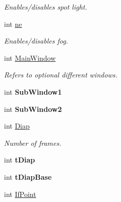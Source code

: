 \begin{DoxyCompactItemize}
\begin{DoxyCompactList}\small\item\em \-Enables/disables spot light. \end{DoxyCompactList}\item 
\hypertarget{classDraw_a3bf1137663f19e5c361c845cf4dfb7db}{int \hyperlink{classDraw_a3bf1137663f19e5c361c845cf4dfb7db}{ne}}\label{classDraw_a3bf1137663f19e5c361c845cf4dfb7db}

\begin{DoxyCompactList}\small\item\em \-Enables/disables fog. \end{DoxyCompactList}\item 
\hypertarget{classDraw_a5123239dd409d2f813d6f4a39a93a560}{int \hyperlink{classDraw_a5123239dd409d2f813d6f4a39a93a560}{\-Main\-Window}}\label{classDraw_a5123239dd409d2f813d6f4a39a93a560}

\begin{DoxyCompactList}\small\item\em \-Refers to optional different windows. \end{DoxyCompactList}\item 
\hypertarget{classDraw_a74c5901821f0f6af7ab263d68531cec7}{int {\bfseries \-Sub\-Window1}}\label{classDraw_a74c5901821f0f6af7ab263d68531cec7}

\item 
\hypertarget{classDraw_a173b380ef4c4936a84d502de1aba75fe}{int {\bfseries \-Sub\-Window2}}\label{classDraw_a173b380ef4c4936a84d502de1aba75fe}

\item 
\hypertarget{classDraw_a5552c93f6dc60d50f083dba82fc5b6cd}{int \hyperlink{classDraw_a5552c93f6dc60d50f083dba82fc5b6cd}{\-Diap}}\label{classDraw_a5552c93f6dc60d50f083dba82fc5b6cd}

\begin{DoxyCompactList}\small\item\em \-Number of frames. \end{DoxyCompactList}\item 
\hypertarget{classDraw_acbff79358479b6a19d039b6ec5ddaf0d}{int {\bfseries t\-Diap}}\label{classDraw_acbff79358479b6a19d039b6ec5ddaf0d}

\item 
\hypertarget{classDraw_a59c57b93252d1e0fca068a43c3a231e3}{int {\bfseries t\-Diap\-Base}}\label{classDraw_a59c57b93252d1e0fca068a43c3a231e3}

\item 
\hypertarget{classDraw_a4bd038ddc170e76bc94d37feb742667c}{int \hyperlink{classDraw_a4bd038ddc170e76bc94d37feb742667c}{\-If\-Point}}\label{classDraw_a4bd038ddc170e76bc94d37feb742667c}


\end{DoxyCompactItemize}
